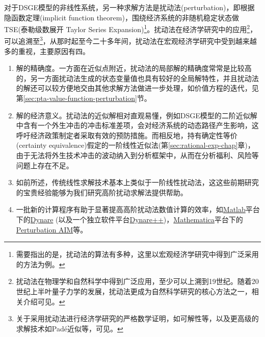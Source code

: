 对于DSGE模型的非线性系统，另一种求解方法是扰动法(perturbation)，即根据隐函数定理(implicit function theorem)，围绕经济系统的非随机稳定状态做TSE(泰勒级数展开 Taylor Series Expansion)\footnote{需要指出的是，扰动法的算法有多种，这里以宏观经济学研究中得到广泛采用的方法为例。}。扰动法在经济学研究中的应用\footnote{扰动法在物理学和自然科学中得到广泛应用，至少可以上溯到19世纪。随着20世纪上半叶量子力学的发展，扰动法更成为自然科学研究的核心方法之一，相关介绍可见\cite{Simmonds:2013vz, Bender:2013vk}。}，可以追溯至\cite{Judd:1993dh}\footnote{关于采用扰动法进行经济学研究的严格数学证明，如可解性等，以及更高级的求解技术如Padé近似等，可见\cite{Judd:1998uy, Judd:2001bl, Jin:2002HV}。}，从那时起至今二十多年间，扰动法在宏观经济学研究中受到越来越多的重视，主要原因有四。
\begin{enumerate}
  \item 解的精确度。一方面在近似点附近，扰动法的局部解的精确度常常是比较高的，另一方面扰动法生成的状态变量值也具有较好的全局解特性\citep{Judd:1998uy, Judd:2001bl, Caldara:2012fr}，并且扰动法的解还可以较方便地交由其他求解方法做进一步处理，如价值方程的迭代，见第\ref{sec:pta-value-function-perturbation}节。
  \item 解的经济意义。扰动法的近似解相对直观易懂，例如DSGE模型的二阶近似解中含有一个外生冲击的冲击标准差项，会对经济系统的动态路径产生影响，这呼吁经济政策制定者采取有效的预防措施。而相反地，持有确定性等价(certainty equivalence)假定的一阶线性近似法(第\ref{sec:rational-exp-chap}章)，由于无法将外生技术冲击的波动纳入到分析框架中，从而在分析福利、风险等问题上存在不足。
  \item 如前所述，传统线性求解技术基本上类似于一阶线性扰动法，这这些前期研究的宝贵经验能够为我们研究高阶扰动求解法提供帮助。
  \item 一批新的计算程序有助于显著提高高阶扰动法数值计算的效率，如\href{https://www.mathworks.com/}{Matlab}平台下的\href{http://www.dynare.org}{Dynare} (以及一个独立软件平台\href{http://www.dynare.org/documentation-and-support/dynarepp}{Dynare++})，\href{http://www.wolfram.com}{Mathematica}平台下的\href{http://www.ericswanson.us/perturbation.html}{Perturbation AIM}等。
\end{enumerate}

